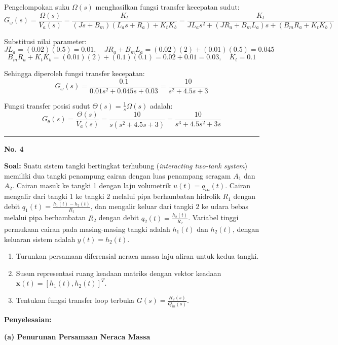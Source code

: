 \documentclass[11pt,a4paper]{article}
\begin{document}
Pengelompokan suku $\Omega(s)$ menghasilkan fungsi transfer kecepatan sudut:
$$G_\omega(s) = \frac{\Omega(s)}{V_a(s)} = \frac{K_t}{(J s + B_m)(L_a s + R_a) + K_t K_b} = \frac{K_t}{J L_a s^2 + (J R_a + B_m L_a) s + (B_m R_a + K_t K_b)}$$

Substitusi nilai parameter:
$$J L_a = (0.02)(0.5) = 0.01, \quad J R_a + B_m L_a = (0.02)(2) + (0.01)(0.5) = 0.045$$
$$B_m R_a + K_t K_b = (0.01)(2) + (0.1)(0.1) = 0.02 + 0.01 = 0.03, \quad K_t = 0.1$$

Sehingga diperoleh fungsi transfer kecepatan:
$$G_\omega(s) = \frac{0.1}{0.01 s^2 + 0.045 s + 0.03} = \frac{10}{s^2 + 4.5 s + 3}$$

Fungsi transfer posisi sudut $\Theta(s) = \frac{1}{s}\Omega(s)$ adalah:
$$G_\theta(s) = \frac{\Theta(s)}{V_a(s)} = \frac{10}{s(s^2 + 4.5 s + 3)} = \frac{10}{s^3 + 4.5 s^2 + 3s}$$

\vspace{12pt}
\hrule
\vspace{10pt}

\textbf{\large No. 4}

\textbf{Soal:}  
Suatu sistem tangki bertingkat terhubung (\textit{interacting two-tank system}) memiliki dua tangki penampung cairan dengan luas penampang seragam $A_1$ dan $A_2$. Cairan masuk ke tangki 1 dengan laju volumetrik $u(t) = q_{in}(t)$. Cairan mengalir dari tangki 1 ke tangki 2 melalui pipa berhambatan hidrolik $R_1$ dengan debit $q_1(t) = \frac{h_1(t) - h_2(t)}{R_1}$, dan mengalir keluar dari tangki 2 ke udara bebas melalui pipa berhambatan $R_2$ dengan debit $q_2(t) = \frac{h_2(t)}{R_2}$. Variabel tinggi permukaan cairan pada masing-masing tangki adalah $h_1(t)$ dan $h_2(t)$, dengan keluaran sistem adalah $y(t) = h_2(t)$.
\begin{enumerate}[label=(\alph*)]
    \item Turunkan persamaan diferensial neraca massa laju aliran untuk kedua tangki.
    \item Susun representasi ruang keadaan matriks dengan vektor keadaan $\mathbf{x}(t) = [h_1(t), h_2(t)]^T$.
    \item Tentukan fungsi transfer loop terbuka $G(s) = \frac{H_2(s)}{Q_{in}(s)}$.
\end{enumerate}

\textbf{Penyelesaian:}

\textbf{(a) Penurunan Persamaan Neraca Massa}
\end{document}
